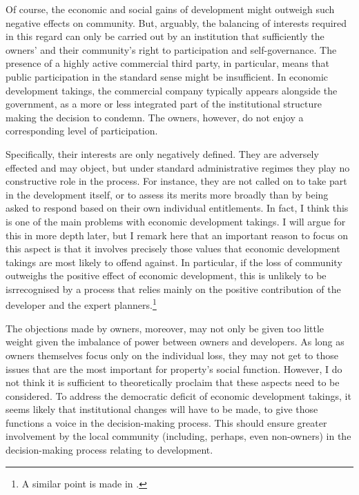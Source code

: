 Of course, the economic and social gains of development might outweigh such negative effects on community. But, arguably, the balancing of interests required in this regard can only be carried out by an institution that sufficiently  the owners' and their community's right to participation and self-governance. The presence of a highly active commercial third party, in particular, means that public participation in the standard sense might be insufficient. In economic development takings, the commercial company typically appears alongside the government, as a more or less integrated part of the institutional structure making the decision to condemn. The owners, however, do not enjoy a corresponding level of participation.

Specifically, their interests are only negatively defined. They are adversely effected and may object, but under standard administrative regimes they play no constructive role in the process. For instance, they are not called on to take part in the development itself, or to assess its merits more broadly than by being asked to respond based on their own individual entitlements. In fact, I think this is one of the main problems with economic development takings. I will argue for this in more depth later, but I remark here that an important reason to focus on this aspect is that it involves precisely those values that economic development takings are most likely to offend against. In particular, if the loss of community outweighs the positive effect of economic development, this is unlikely to be isr{recognised} by a process that relies mainly on the positive contribution of the developer and the expert planners.\footnote{A similar point is made in \cite{underkuffler06}.} 

The objections made by owners, moreover, may not only be given too little weight given the imbalance of power between owners and developers. As long as owners themselves focus only on the individual loss, they may not get to those issues that are the most important for property's social function. However, I do not think it is sufficient to theoretically proclaim that these aspects need to be considered. To address the democratic deficit of economic development takings, it seems likely that institutional changes will have to be made, to give those functions a voice in the decision-making process. This should ensure greater involvement by the local community (including, perhaps, even non-owners) in the decision-making process relating to development. 

